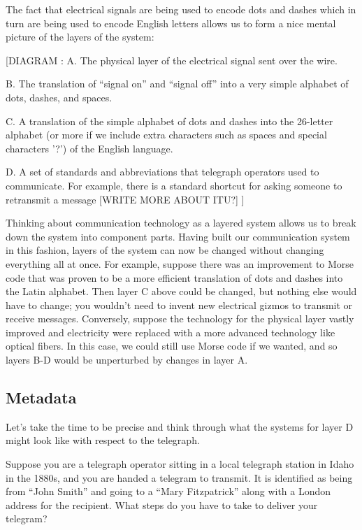 \documentclass[UTF8]{book}
\begin{document}
\begin{CJK}{UTF8}{gbsn}
The fact that electrical signals are being used to encode dots and dashes which in turn are being used to encode English letters allows us to form a nice mental picture of the layers of the system:

[DIAGRAM :
A. The physical layer of the electrical signal sent over the wire.

B. The translation of “signal on” and “signal off” into a very simple alphabet of dots, dashes, and spaces.

C. A translation of the simple alphabet of dots and dashes into the 26-letter alphabet (or more if we include extra characters such as spaces and special characters '?') of the English language.

D. A set of standards and abbreviations that telegraph operators used to communicate. For example, there is a standard shortcut for asking someone to retransmit a message [WRITE MORE ABOUT ITU?]
]

Thinking about communication technology as a layered system allows us to break down the system into component parts. Having built our communication system in this fashion, layers of the system can now be changed without changing everything all at once. For example, suppose there was an improvement to Morse code that was proven to be a more efficient translation of dots and dashes into the Latin alphabet. Then layer C above could be changed, but nothing else would have to change; you wouldn't need to invent new electrical gizmos to transmit or receive messages. Conversely, suppose the technology for the physical layer vastly improved and electricity were replaced with a more advanced technology like optical fibers. In this case, we could still use Morse code if we wanted, and so layers B-D would be unperturbed by changes in layer A.

\subsection{Metadata}

Let's take the time to be precise and think through what the systems for layer D might look like with respect to the telegraph.

Suppose you are a telegraph operator sitting in a local telegraph station in Idaho in the 1880s, and you are handed a telegram to transmit. It is identified as being from ``John Smith'' and going to a ``Mary Fitzpatrick'' along with a London address for the recipient. What steps do you have to take to deliver your telegram?


\end{CJK}
\end{document}
